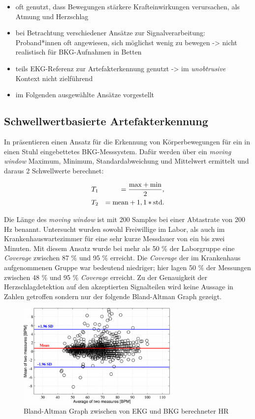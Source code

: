 \begin{itemize}
		\item oft genutzt, dass Bewegungen stärkere Krafteinwirkungen verursachen, als Atmung und Herzschlag
		\item bei Betrachtung verschiedener Ansätze zur Signalverarbeitung: Proband*innen oft angewiesen, sich möglichst wenig zu bewegen -> nicht realistisch für BKG-Aufnahmen in Betten
		\item teils EKG-Referenz zur Artefakterkennung genutzt -> im \textit{unobtrusive} Kontext nicht zielführend
		\item im Folgenden ausgewählte Ansätze vorgestellt
	\end{itemize}

	\subsection{Schwellwertbasierte Artefakterkennung}
	
	In  präsentieren \citeauthor{Pino2015} einen Ansatz für die Erkennung von Körperbewegungen für ein in einen Stuhl eingebettetes \ac{BKG}-Messsystem. Dafür werden über ein \textit{moving window} Maximum, Minimum, Standardabweichung und Mittelwert ermittelt und daraus 2 Schwellwerte berechnet:
	
	\begin{eqnarray*}
		&T_1 &= \frac{\text{max} + \text{min}}{2},\notag\\
		&T_2 &= \text{mean} + 1,1 * \text{std}.\notag
	\end{eqnarray*}
	
	Die Länge des \textit{moving window} ist mit 200 Samples bei einer Abtastrate von 200 Hz benannt. Untersucht wurden sowohl Freiwillige im Labor, als auch im Krankenhauswartezimmer für eine sehr kurze Messdauer von ein bis zwei Minuten. Mit diesem Ansatz wurde bei mehr als 50 \% der Laborgruppe eine \textit{Coverage} zwischen 87 \% und 95 \% erreicht. Die \textit{Coverage} der im Krankenhaus aufgenommenen Gruppe war bedeutend niedriger; hier lagen 50 \% der Messungen zwischen 48 \% und 95 \% \textit{Coverage} erreicht. Zu der Genauigkeit der Herzschlagdetektion auf den akzeptierten Signalteilen wird keine Aussage in Zahlen getroffen sondern nur der folgende Bland-Altman Graph gezeigt.
	
	\begin{figure}[H]
		\centering
		\includegraphics[width=0.7\textwidth]{pic/bland-altman-pino.png}
		\caption[Bland-Altman Graph zwischen von \ac{EKG} und \ac{BKG} berechneter \ac{HR}]{Bland-Altman Graph zwischen von \ac{EKG} und \ac{BKG} berechneter \ac{HR}}
		\label{fig:bland-altman-pino}
	\end{figure}
	
